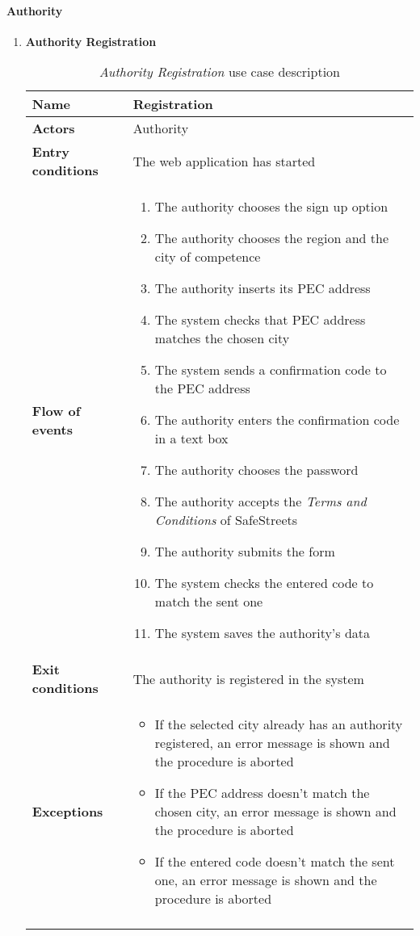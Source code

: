 		\FloatBarrier
		\newpage
			
		\paragraph{Authority}
		\begin{enumerate}
			\item \textbf{Authority Registration}
				\begin{longtable}{p{0.26\linewidth}p{0.75\linewidth}}
					\toprule
					\textbf{Name} & \textbf{Registration} \\
					\midrule
					\textbf{Actors} & Authority \\
					\midrule
					\textbf{Entry conditions} & The web application has started \\
					\midrule
					\textbf{Flow of events} & 
					\begin{enumerate}
						\item The authority chooses the sign up option
						\item The authority chooses the region and the city of competence
						\item The authority inserts its PEC address
						\item The system checks that PEC address matches the chosen city
						\item The system sends a confirmation code to the PEC address
						\item The authority enters the confirmation code in a text box
						\item The authority chooses the password
						\item The authority accepts the \emph{Terms and Conditions} of SafeStreets
						\item The authority submits the form
						\item The system checks the entered code to match the sent one
						\item The system saves the authority's data
					\end{enumerate} \\
					\midrule
					\textbf{Exit conditions} & The authority is registered in the system\\
					\midrule
					\textbf{Exceptions} & 
					\begin{itemize}
						\item If the selected city already has an authority registered, an error message is shown and the procedure is aborted
						\item If the PEC address doesn't match the chosen city, an error message is shown and the procedure is aborted
						\item If the entered code doesn't match the sent one, an error message is shown and the procedure is aborted
					\end{itemize} \\
					\bottomrule
					\caption{\emph{Authority Registration} use case description}
				\end{longtable}
			

\end{enumerate}
